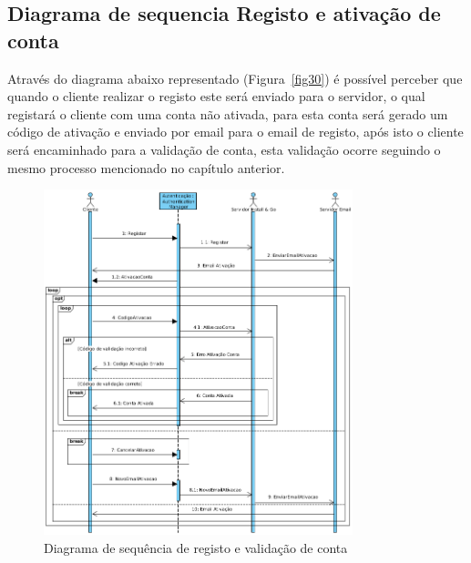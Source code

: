 \newpage

\subsection{Diagrama de sequencia Registo e ativação de conta}

Através do diagrama abaixo representado (Figura~\ref{fig30}) é possível perceber que quando o cliente realizar o registo este será enviado para o servidor, o qual registará o cliente com uma conta não ativada, para esta conta será gerado um código de ativação e enviado por email para o email de registo, após isto o cliente será encaminhado para a validação de conta, esta validação ocorre seguindo o mesmo processo mencionado no capítulo anterior.


\begin{figure}[htb]
    \centering
    \includegraphics[width=0.8\textwidth]{images/diagramas/sequencia/diagrama_registo.png}
    \caption{Diagrama de sequência de registo e validação de conta}
    \label{fig:31}
\end{figure}